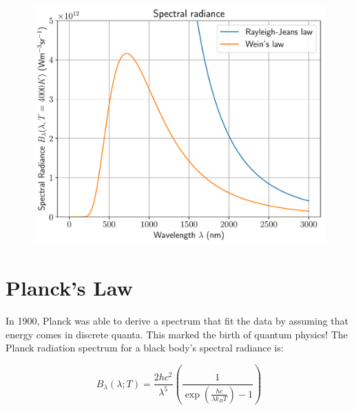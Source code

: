 \documentclass[
  letterpaper,
  DIV=11,
  numbers=noendperiod]{scrreprt}
\begin{document}
\begin{figure}[H]

{\centering \includegraphics{SP1.1_-_Stellar_Properties_files/figure-pdf/cell-20-output-1.pdf}

}

\end{figure}

\hypertarget{plancks-law}{%
\section{Planck's Law}\label{plancks-law}}

In 1900, Planck was able to derive a spectrum that fit the data by
assuming that energy comes in discrete quanta. This marked the birth of
quantum physics! The Planck radiation spectrum for a black body's
spectral radiance is:

\begin{equation}
B_\lambda(\lambda; T) = \frac{2 hc^2}{\lambda^5}\left(\frac{1}{\exp\left(\frac{hc}{\lambda k_B T}\right) -1} \right)
\end{equation}
\end{document}
